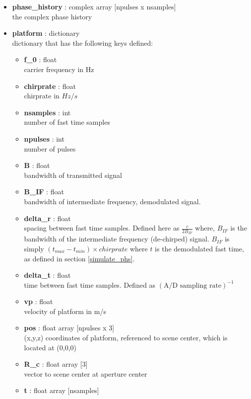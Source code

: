 \documentclass{article}
\newcommand{\defs}[2]{\textbf{{#1}} : {#2}}
\begin{document}
\begin{itemize}
	\item \defs{phase\_history}{complex array [npulses x nsamples]}\\
		the complex phase history
	  \item \defs{platform}{dictionary}\\
	  	dictionary that has the following keys defined:
	  \begin{itemize}
	    \item \defs{f\_0}{float}\\
	    	carrier frequency in Hz
		\item \defs{chirprate}{float}\\
		   	chirprate in $Hz/s$
	    \item \defs{nsamples}{int}\\
	    	number of fast time samples
	    \item \defs{npulses}{int}\\
	    	number of pulses
	    \item \defs{B}{float}\\
	    	bandwidth of transmitted signal
	    \item \defs{B\_IF}{float}\\
	    	bandwidth of intermediate frequency, demodulated signal.
	    \item \defs{delta\_r}{float}\\
       	   	spacing between fast time samples.  Defined here as $\frac{c}{2B_{IF}}$ where, $B_{IF}$ is the bandwidth of the intermediate frequency (de-chirped) signal.  $B_{IF}$ is simply $(t_{max}-t_{min})\times chirprate$ where $t$ is the demodulated fast time, as defined in section \ref{simulate_phs}.
    	\item \defs{delta\_t}{float}\\
    		time between fast time samples.  Defined as $(\mbox{A/D sampling rate})^{-1}$
    	\item \defs{vp}{float}\\
	   		velocity of platform in m/s
	   	\item \defs{pos}{float array [npulses x 3]}\\
	       	(x,y,z) coordinates of platform, referenced to scene center, which is located at (0,0,0)
	    \item \defs{R\_c}{float array [3]}\\
	     	vector to scene center at aperture center
	    \item \defs{t}{float array [nsamples]}\\

\end{itemize}
\end{itemize}
\end{document}
